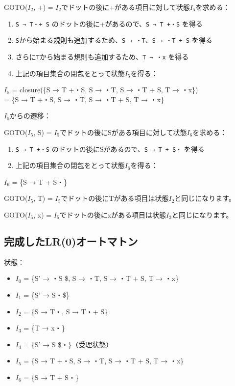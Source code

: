 GOTO(\(I_2\), +) =
\(I_2\)でドットの後に+がある項目に対して状態\(I_5\)を求める：

\begin{enumerate}
\def\labelenumi{\arabic{enumi}.}
\tightlist
\item
  \texttt{S\ →\ T・+\ S}
  のドットの後に+があるので、\texttt{S\ →\ T\ +・S} を得る
\item
  \texttt{S}から始まる規則も追加するため、\texttt{S\ →\ ・T}、\texttt{S\ →\ ・T\ +\ S}
  を得る
\item
  さらに\texttt{T}から始まる規則も追加するため、\texttt{T\ →\ ・x}
  を得る
\item
  上記の項目集合の閉包をとって状態\(I_5\)を得る：
\end{enumerate}

\(I_5\) = closure(\{S → T +・S, S → ・T, S → ・T + S, T → ・x\})\\
= \{S → T +・S, S → ・T, S → ・T + S, T → ・x\}

\(I_5\)からの遷移：

GOTO(\(I_5\), S) =
\(I_5\)でドットの後にSがある項目に対して状態\(I_6\)を求める：

\begin{enumerate}
\def\labelenumi{\arabic{enumi}.}
\tightlist
\item
  \texttt{S\ →\ T\ +・S}
  のドットの後にSがあるので、\texttt{S\ →\ T\ +\ S・} を得る
\item
  上記の項目集合の閉包をとって状態\(I_6\)を得る：
\end{enumerate}

\(I_6\) = \{S → T + S・\}

GOTO(\(I_5\), T) =
\(I_5\)でドットの後にTがある項目は状態\(I_2\)と同じになります。

GOTO(\(I_5\), x) =
\(I_5\)でドットの後にxがある項目は状態\(I_3\)と同じになります。

\hypertarget{chapter5-ux5b8cux6210ux3057ux305flr0ux30aaux30fcux30c8ux30deux30c8ux30f3}{%
\subsection{完成したLR(0)オートマトン}\label{chapter5-ux5b8cux6210ux3057ux305flr0ux30aaux30fcux30c8ux30deux30c8ux30f3}}

状態：

\begin{itemize}
\tightlist
\item
  \(I_0\) = \{S' → ・S \$, S → ・T, S → ・T + S, T → ・x\}
\item
  \(I_1\) = \{S' → S・\$\}
\item
  \(I_2\) = \{S → T・, S → T・+ S\}
\item
  \(I_3\) = \{T → x・\}
\item
  \(I_4\) = \{S' → S \$・\}（受理状態）
\item
  \(I_5\) = \{S → T +・S, S → ・T, S → ・T + S, T → ・x\}
\item
  \(I_6\) = \{S → T + S・\}
\end{itemize}

